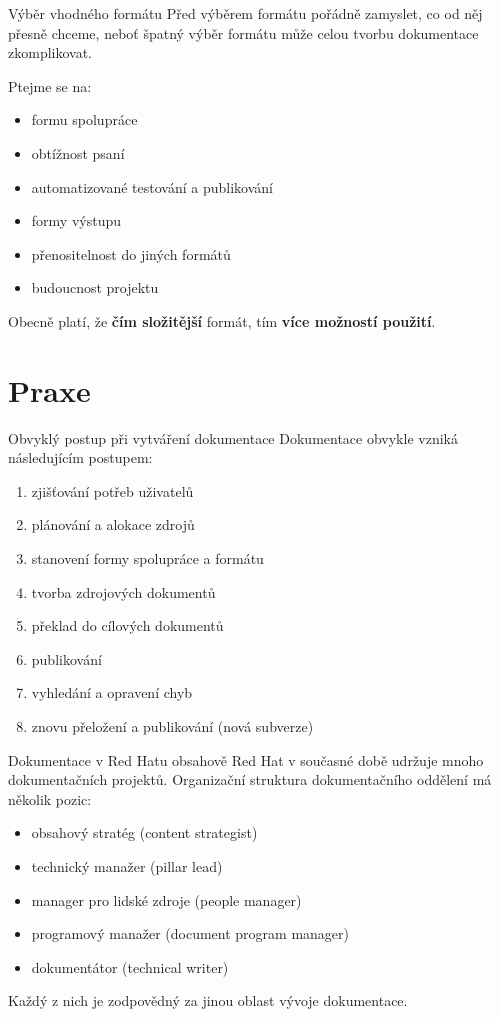 \documentclass[12pt]{beamer}
\begin{document}
	\begin{frame}{Výběr vhodného formátu}
	Před výběrem formátu pořádně zamyslet, co od něj přesně chceme, neboť špatný výběr formátu může celou tvorbu dokumentace zkomplikovat.

	Ptejme se na:
	
	\begin{itemize}
		\item formu spolupráce
		\item obtížnost psaní
		\item automatizované testování a publikování
		\item formy výstupu
		\item přenositelnost do jiných formátů
		\item budoucnost projektu
	\end{itemize}
	Obecně platí, že \textbf{čím složitější} formát, tím \textbf{více možností použití}.
	\end{frame}

	\section{Praxe}	

	\begin{frame}{Obvyklý postup při vytváření dokumentace}
	Dokumentace obvykle vzniká následujícím postupem:
			\begin{enumerate}
				\item zjišťování potřeb uživatelů
				\item plánování a alokace zdrojů
				\item stanovení formy spolupráce a formátu
				\item tvorba zdrojových dokumentů
				\item překlad do cílových dokumentů
				\item publikování
				\item vyhledání a opravení chyb
				\item znovu přeložení a publikování (nová subverze)
			\end{enumerate}
	\end{frame}

\begin{frame}{Dokumentace v Red Hatu obsahově}
Red Hat v současné době udržuje mnoho dokumentačních projektů. Organizační struktura dokumentačního oddělení má několik pozic:

\begin{itemize}
	\item obsahový stratég (content strategist)
	\item technický manažer (pillar lead)
	\item manager pro lidské zdroje (people manager)
	\item programový manažer (document program manager)
	\item dokumentátor (technical writer)
\end{itemize}

Každý z nich je zodpovědný za jinou oblast vývoje dokumentace.
\end{frame}
\end{document}
